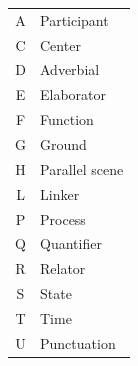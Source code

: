 \documentclass[extrafontsizes,60pt,twocolumn]{memoir}
\begin{document}
\hfill
\begin{minipage}{.13\columnwidth}\color{white}
  \begin{adjustbox}{margin=.5in,frame,scale=.75,bgcolor=Navy}
  \begin{tabular}{>{\ttfamily}c@{\hskip 1in\bfseries}l}
    A & Participant \\
    C & Center \\
    D & Adverbial \\
    E & Elaborator \\
    F & Function \\
    G & Ground \\
    H & Parallel scene \\
    L & Linker \\
    P & Process \\
    Q & Quantifier \\
    R & Relator \\
    S & State \\
    T & Time \\
    U & Punctuation
  \end{tabular}
  \end{adjustbox}
\end{minipage}
\hspace{-.6in}
\end{document}
